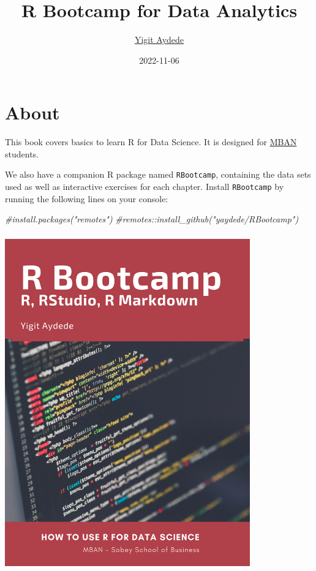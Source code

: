 \documentclass[
]{book}
\title{R Bootcamp for Data Analytics}
\author{\href{https://yaydede.github.io/}{Yigit Aydede}}
\date{2022-11-06}
\newenvironment{Shaded}{\begin{snugshade}}{\end{snugshade}}
\newcommand{\CommentTok}[1]{\textcolor[rgb]{0.56,0.35,0.01}{\textit{#1}}}
\begin{document}
\maketitle

{
\hypersetup{linkcolor=}
\setcounter{tocdepth}{1}
\tableofcontents
}
\hypertarget{about}{%
\chapter*{About}\label{about}}

This book covers basics to learn R for Data Science. It is designed for \href{https://www.smu.ca/mban/index.html}{MBAN} students.

We also have a companion R package named \texttt{RBootcamp}, containing the data sets used as well as interactive exercises for each chapter. Install \texttt{RBootcamp} by running the following lines on your console:

\begin{Shaded}
\begin{Highlighting}[]
\CommentTok{\#install.packages("remotes")}
\CommentTok{\#remotes::install\_github("yaydede/RBootcamp")}
\end{Highlighting}
\end{Shaded}

\includegraphics[width=4.16667in,height=5.72917in]{png/cover2.png}
\end{document}
